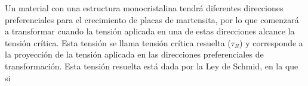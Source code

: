 \documentclass[a4paper,12pt,fleqn,twoside,openany]{book}
\begin{document}
Un material con una estructura monocristalina tendrá diferentes direcciones preferenciales para el crecimiento de placas de martensita, por lo que comenzará a transformar cuando la tensión aplicada en una de estas direcciones alcance la tensión crítica. Esta tensión se llama tensión crítica resuelta ($\tau_{R}$) y corresponde a la proyección de la tensión aplicada en las direcciones preferenciales de transformación. Esta tensión resuelta está dada por la Ley de Schmid, en la que si
%
\end{document}
